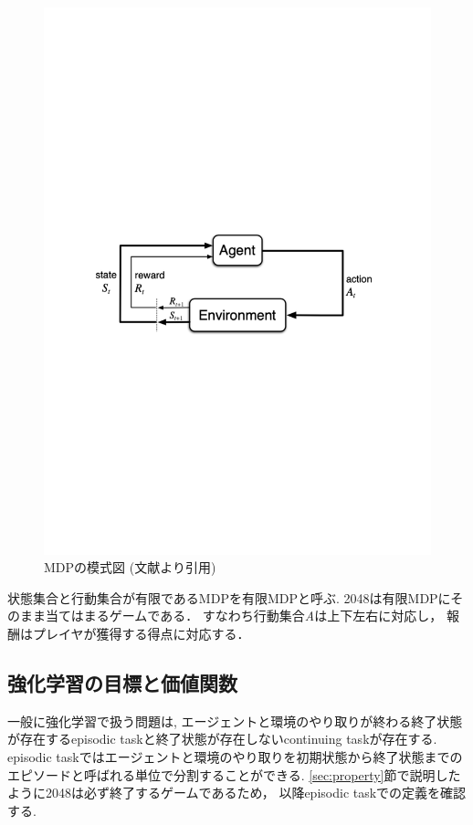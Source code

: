 \begin{figure}[h]
  \centering
  \includegraphics[width=\linewidth{}]{figures/MDP.pdf}
  \caption{MDPの模式図 (文献\cite{Sutton1998}より引用) \label{fig:mdp}}
\end{figure}

状態集合と行動集合が有限であるMDPを有限MDPと呼ぶ.
2048は有限MDPにそのまま当てはまるゲームである．
すなわち行動集合\textit{A}は上下左右に対応し， 報酬はプレイヤが獲得する得点に対応する．

\subsection{強化学習の目標と価値関数}
一般に強化学習で扱う問題は, エージェントと環境のやり取りが終わる終了状態が存在するepisodic taskと終了状態が存在しないcontinuing taskが存在する. 
episodic taskではエージェントと環境のやり取りを初期状態から終了状態までのエピソードと呼ばれる単位で分割することができる.
\ref{sec:property}節で説明したように2048は必ず終了するゲームであるため， 以降episodic taskでの定義を確認する. 

